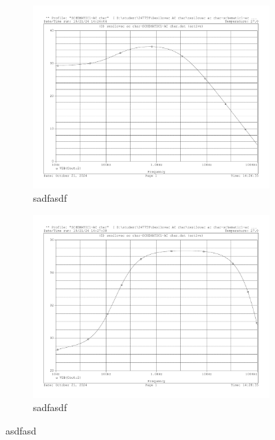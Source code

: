 \documentclass[a4paper, czech]{article}
\begin{document}
\begin{figure}[H]
    \centering
    \begin{subfigure}{0.49\textwidth}
        \centering
        \includegraphics[width=\textwidth]{charakteristiky/uloha3_Rs_5krat_vetsi_340k.pdf}
        \caption{sadfasdf}
    \end{subfigure}
    \hfill
    \begin{subfigure}{0.49\textwidth}
        \centering
        \includegraphics[width=\textwidth]{charakteristiky/uloha3_Rs_5krat_mensi_13_6k.pdf}
        \caption{sadfasdf}
    \end{subfigure}
    \caption{asdfasd}
\end{figure}
\end{document}
